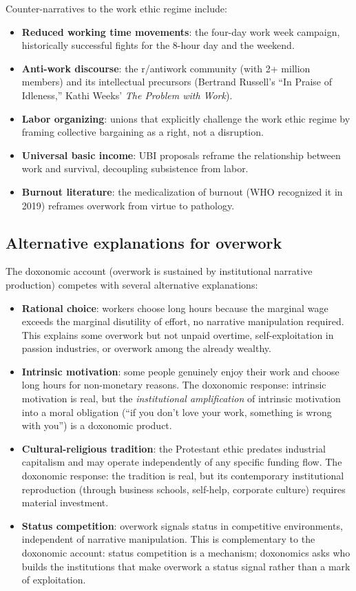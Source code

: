 Counter-narratives to the work ethic regime include:
\begin{itemize}[nosep]
  \item \textbf{Reduced working time movements}: the four-day work week campaign, historically successful fights for the 8-hour day and the weekend.
  \item \textbf{Anti-work discourse}: the r/antiwork community (with 2+ million members) and its intellectual precursors (Bertrand Russell's ``In Praise of Idleness,'' Kathi Weeks' \emph{The Problem with Work}).
  \item \textbf{Labor organizing}: unions that explicitly challenge the work ethic regime by framing collective bargaining as a right, not a disruption.
  \item \textbf{Universal basic income}: UBI proposals reframe the relationship between work and survival, decoupling subsistence from labor.
  \item \textbf{Burnout literature}: the medicalization of burnout (WHO recognized it in 2019) reframes overwork from virtue to pathology.
\end{itemize}

\subsection{Alternative explanations for overwork}

The doxonomic account (overwork is sustained by institutional narrative production) competes with several alternative explanations:
\begin{itemize}[nosep]
  \item \textbf{Rational choice}: workers choose long hours because the marginal wage exceeds the marginal disutility of effort, no narrative manipulation required.
  This explains some overwork but not unpaid overtime, self-exploitation in passion industries, or overwork among the already wealthy.
  \item \textbf{Intrinsic motivation}: some people genuinely enjoy their work and choose long hours for non-monetary reasons.
  The doxonomic response: intrinsic motivation is real, but the \emph{institutional amplification} of intrinsic motivation into a moral obligation (``if you don't love your work, something is wrong with you'') is a doxonomic product.
  \item \textbf{Cultural-religious tradition}: the Protestant ethic predates industrial capitalism and may operate independently of any specific funding flow.
  The doxonomic response: the tradition is real, but its contemporary institutional reproduction (through business schools, self-help, corporate culture) requires material investment.
  \item \textbf{Status competition}: overwork signals status in competitive environments, independent of narrative manipulation.
  This is complementary to the doxonomic account: status competition is a mechanism; doxonomics asks who builds the institutions that make overwork a status signal rather than a mark of exploitation.
\end{itemize}

